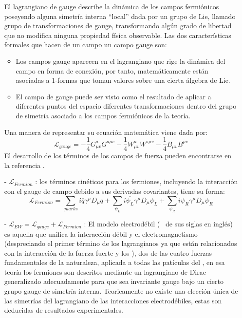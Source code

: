 \begin{itemize}
El lagrangiano de gauge describe la dinámica de los campos fermiónicos poseyendo alguna simetría interna ``local'' dada por un grupo de Lie, llamado grupo de transformaciones de gauge, transformando algún grado de libertad que no modifica ninguna propiedad física observable. Las dos características formales que hacen de un campo un campo gauge son:
\begin{itemize}
\item Los campos gauge aparecen en el lagrangiano que rige la dinámica del campo en forma de conexión, por tanto, matemáticamente están asociadas a 1-formas que toman valores sobre una cierta álgebra de Lie.
\item El campo de gauge puede ser visto como el resultado de aplicar a diferentes puntos del espacio diferentes transformaciones dentro del grupo de simetría asociado a los campos fermiónicos de la teoría.
\end{itemize}
Una manera de representar su ecuación matemática viene dada por:
\begin{equation}
\mathcal{L}_{gauge} = 
-\dfrac{1}{4}G_{\mu v}^{a} G^{a\mu v} 
-\dfrac{1}{4}W_{\mu v}^{a} W^{a\mu v} 
-\dfrac{1}{4}B_{\mu v} B^{\mu v}
\end{equation}
El desarrollo de los términos de los campos de fuerza pueden encontrarse en la referencia \citep{romao_resource_2012}.
\item[-] $\mathcal{L}_{Fermion}$ : los términos cinéticos para los fermiones, incluyendo la interacción con el gauge de campo debido a sus derivadas covariantes, tiene su forma:
\begin{equation}
\mathcal{L}_{Fermion} = 
\sum_{quarks} i \overline{q} \gamma^\mu D_\mu q +
\sum_{\psi_L} i \overline{\psi_L} \gamma^\mu D_\mu \psi_L +
\sum_{\psi_R} i \psi_R \gamma^\mu D_\mu \psi_R
\end{equation}

\item[-] $\mathcal{L}_{EW} = \mathcal{L}_{gauge} + \mathcal{L}_{Fermion}$ : El modelo electrodébil (\EW ~ de sus siglas en inglés) es aquella que unifica la interacción débil y el electromagnetismo (despreciando el primer término de los lagrangianos ya que están relacionados con la interacción de la fuerza fuerte y los \quarks), dos de las cuatro fuerzas fundamentales de la naturaleza, aplicada a todas las patículas del \ME, en esa teoría los fermiones son descritos mediante un lagrangiano de Dirac generalizado adecuadamente para que sea invariante gauge bajo un cierto grupo gauge de simetría interna. Teoricamente no existe una elección única de las simetrías del lagrangiano de las interacciones electrodébiles, estas son deducidas de resultados experimentales.


\end{itemize}
